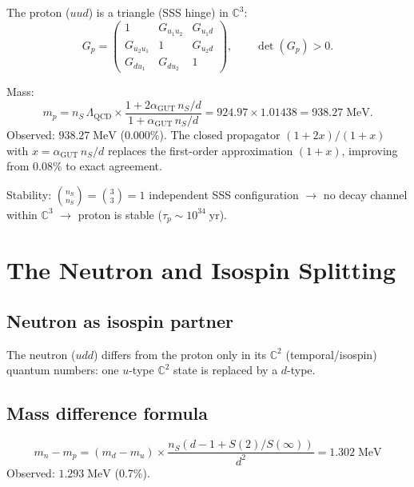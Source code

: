 \documentclass[12pt]{article}
\theoremstyle{remark}
\begin{document}
The proton ($uud$) is a triangle (SSS hinge) in $\mathbb{C}^3$:
\begin{equation}
G_p = \begin{pmatrix} 1 & G_{u_1 u_2} & G_{u_1 d} \\ G_{u_2 u_1} & 1 & G_{u_2 d} \\ G_{d u_1} & G_{d u_2} & 1 \end{pmatrix}, \qquad \det(G_p) > 0.
\end{equation}

Mass:
\begin{equation}
m_p = n_S \,\Lambda_\text{QCD} \times \frac{1 + 2\alpha_\text{GUT}\,n_S/d}{1 + \alpha_\text{GUT}\,n_S/d} = 924.97 \times 1.01438 = 938.27\;\text{MeV}.
\end{equation}
Observed: $938.27\;\text{MeV}$ (0.000\%).  The closed propagator $(1+2x)/(1+x)$ with $x = \alpha_\text{GUT}\,n_S/d$ replaces the first-order approximation $(1 + x)$, improving from 0.08\% to exact agreement.

Stability: $\binom{n_S}{n_S} = \binom{3}{3} = 1$ independent SSS configuration $\to$ no decay channel within $\mathbb{C}^3$ $\to$ proton is stable ($\tau_p \sim 10^{34}\;\text{yr}$).

\section{The Neutron and Isospin Splitting}

\subsection{Neutron as isospin partner}

The neutron ($udd$) differs from the proton only in its $\mathbb{C}^2$ (temporal/isospin) quantum numbers: one $u$-type $\mathbb{C}^2$ state is replaced by a $d$-type.

\subsection{Mass difference formula}

\begin{equation}
\boxed{m_n - m_p = (m_d - m_u) \times \frac{n_S\!\left(d - 1 + S(2)/S(\infty)\right)}{d^2} = 1.302\;\text{MeV}}
\end{equation}
Observed: $1.293\;\text{MeV}$ (0.7\%).
\end{document}
